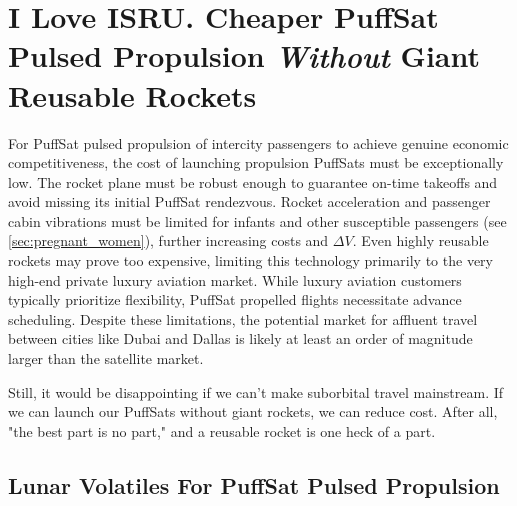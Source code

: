 \documentclass{article}
\begin{document}
{\section{I Love ISRU.  Cheaper PuffSat Pulsed Propulsion \textit{Without} Giant Reusable Rockets}
For PuffSat pulsed propulsion of intercity passengers to achieve genuine economic competitiveness, the cost of launching  propulsion PuffSats must be exceptionally low.  The rocket plane must be robust enough to guarantee on-time takeoffs and avoid missing its initial PuffSat rendezvous.  Rocket acceleration and passenger cabin vibrations must be limited for infants and other susceptible passengers (see \autoref{sec:pregnant_women}), further increasing costs and $\Delta V$.  Even highly reusable rockets may prove too expensive, limiting this technology primarily to the very high-end private luxury aviation market. While luxury aviation customers typically prioritize flexibility, PuffSat propelled flights necessitate advance scheduling.  Despite these limitations, the potential market for affluent travel between cities like Dubai and Dallas is likely at least an order of magnitude larger than the satellite market.

Still, it would be disappointing if we can't make suborbital travel mainstream.   If we can launch our PuffSats without giant rockets, we can reduce cost.   After all, "the best part is no part," \cite{best_part_no_part} and a reusable rocket is one heck of a part.

\subsection{Lunar Volatiles For PuffSat Pulsed Propulsion}

}
\end{document}
